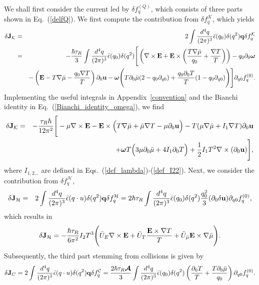 \documentclass[aps,prd,showkeys,preprint,amsmath,amssymb,nofootinbib]{revtex4-1}
\begin{document}
We shall first consider the current led by $\delta f^{(Q)}_q$, which consists of three parts shown in Eq.~(\ref{delfQ}). We first compute the contribution from $\delta f^{\mathcal{K}}_q$, which yields
\begin{eqnarray}\nonumber
\delta {\bf J}_{\mathcal{K}}&=&2\int\frac{d^4q}{(2\pi)^3}\bar{\epsilon}(q_0)\delta(q^2){\bf q}\delta f^{\mathcal{K}}_q
\\\nonumber
&=&-\frac{\hbar\tau_R}{3}\int\frac{d^4q}{(2\pi)^3}\bar{\epsilon}(q_0)\delta(q^2)
\Bigg[\left({\bf\nabla\times E}+{\bf E}\times\left(\frac{T\nabla\bar{\mu}}{q_0}+\frac{\nabla T}{T}\right)\right)
-q_0\partial_0\bm{\omega}
\\\nonumber
&&
-\left({\bf E}-T\nabla\bar{\mu}-\frac{q_0\nabla T}{T}\right)\partial_0{\bf u}
-\bm{\omega}\Bigg(T\partial_0\bar{\mu}(2-q_0\partial_{q0})+\frac{q_0\partial_0T}{T}(1-q_0\partial_{q0})\Bigg)
\Bigg]\partial_{q0}f^{(0)}_q.
\\
\end{eqnarray}
Implementing the useful integrals in Appendix~\ref{convention} and the Bianchi identity in Eq.~(\ref{Bianchi_identity_omega}), we find
\begin{eqnarray}\nonumber
\delta {\bf J}_{\mathcal{K}}
&=&-
\frac{\tau_R\hbar}{12\pi^2}\Bigg[
-\mu\nabla\times{\bf E}
-{\bf E}\times\Big(T\nabla\bar{\mu}+\bar{\mu}\nabla T-\mu\partial_0{\bf u}\Big)
-T(\mu\nabla\bar{\mu}+I_1\nabla T)\partial_0{\bf u}
\\\nonumber
&&
+\bm{\omega}T\Big(3\mu\partial_0\bar{\mu}+4I_1\partial_0T\Big)
+\frac{1}{2}I_1T^2\nabla\times(\partial_0{\bf u})
\Bigg],
\end{eqnarray}
where $I_{1,2\dots}$ are defined in Eqs.~(\ref{def_lambda})-(\ref{def_I22}). 
Next, we consider the contribution from $\delta f^{\mathcal{H}}_q$,
\begin{eqnarray}
\delta {\bf J}_{\mathcal{H}}&=&2\int\frac{d^4q}{(2\pi)^3}\bar{\epsilon}(q\cdot u)\delta(q^2){\bf q}\delta f^{\mathcal{H}}_q
=2\hbar\tau_R\int\frac{d^4q}{(2\pi)^3}\bar{\epsilon}(q_0)\delta(q^2)
\frac{q_0^2}{3}(\partial_0\delta {\bf u})\partial_{q0}f^{(0)}_q,
\end{eqnarray}
which results in  
\begin{eqnarray}
\delta {\bf J}_{\mathcal{H}}=-\frac{\hbar\tau_R}{6\pi^2}I_2T^3\Bigg(\tilde{U}_E\nabla\times {\bf E}+\tilde{U}_T\frac{{\bf E}\times\nabla T}{T}+\tilde{U}_{\bar{\mu}}{\bf E}\times\nabla\bar{\mu}\Bigg).
\end{eqnarray}
Subsequently, the third part stemming from collisions is given by
\begin{eqnarray}
\delta {\bf J}_{C}=2\int\frac{d^4q}{(2\pi)^3}\bar{\epsilon}(q\cdot u)\delta(q^2){\bf q}\delta f^{\mathcal{C}}_q
=\frac{2\hbar\tau_R\bm{\mathcal{A}}}{3}\int\frac{d^4q}{(2\pi)^3}\bar{\epsilon}(q_0)\delta(q^2)
\left(\frac{\partial_0T}{T}+\frac{T\partial_0\bar{\mu}}{q_0}\right)\partial_{q0}f^{(0)}_q.
\end{eqnarray} 
\end{document}
